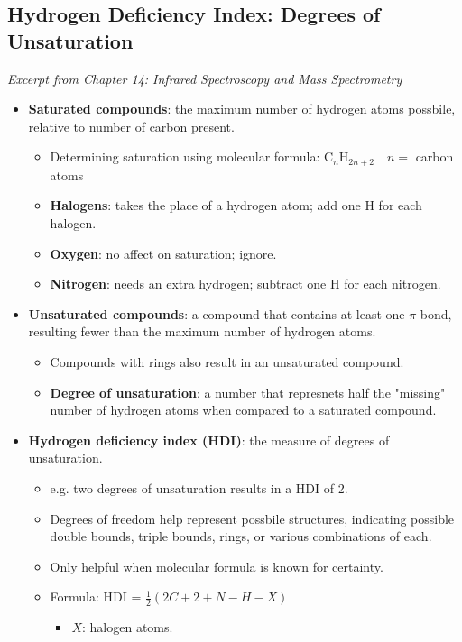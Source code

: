 \documentclass[12pt,a4paper]{article}
\begin{document}
\subsection{Hydrogen Deficiency Index: Degrees of Unsaturation}
{\color{G-Moon}\textit{Excerpt from Chapter 14: Infrared Spectroscopy and Mass Spectrometry}}
\begin{itemize}
    \item \textbf{Saturated compounds}: the maximum number of hydrogen atoms possbile, relative to number of carbon present.
        \begin{itemize}
            \item Determining saturation using molecular formula: {\color{o-Sun}C\(_{n}\)H\(_{2n+2}\)}~~\(n=\) carbon atoms
        \end{itemize}
            \begin{itemize}
                \item \textbf{Halogens}: takes the place of a hydrogen atom; {\color{o-Sun}add one H} for each halogen.
                \item \textbf{Oxygen}: no affect on saturation; {\color{o-Sun}ignore}.
                \item \textbf{Nitrogen}: needs an extra hydrogen; {\color{o-Sun}subtract one H} for each nitrogen. 
            \end{itemize}
    \item \textbf{Unsaturated compounds}: a compound that contains at least one $\pi$ bond, resulting fewer than the maximum number of hydrogen atoms.
        \begin{itemize}
            \item Compounds with rings also result in an unsaturated compound.
            \item \textbf{Degree of unsaturation}: a number that represnets {\color{o-Sun}half} the {\color{o-Sun}"missing"} number of hydrogen atoms when compared to a saturated compound.
        \end{itemize}
    \item \textbf{Hydrogen deficiency index (HDI)}: the measure of degrees of unsaturation. 
        \begin{itemize}
            \item e.g. two degrees of unsaturation results in a HDI of 2.
            \item Degrees of freedom help represent possbile structures, indicating possible double bounds, triple bounds, rings, or various combinations of each.
            \item Only helpful when molecular formula is known for certainty.
            \item Formula: {\color{o-Sun}HDI = \(\frac{1}{2}(2C + 2 + N - H - X)\)}
            \begin{itemize}
                \item \(X\): halogen atoms.
        \end{itemize}
    \end{itemize}
\end{itemize}
\end{document}
